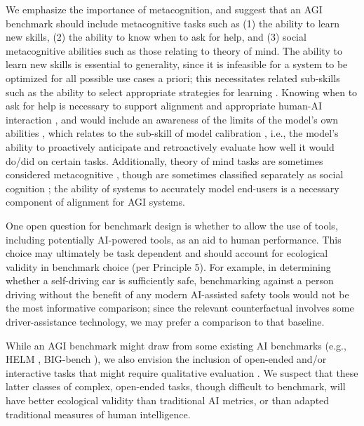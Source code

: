 \documentclass{article}
\theoremstyle{plain}
\theoremstyle{definition}
\theoremstyle{remark}
\begin{document}
We emphasize the importance of metacognition, and suggest that an AGI benchmark should include metacognitive tasks such as (1) the ability to learn new skills, (2) the ability to know when to ask for help, and (3) social metacognitive abilities such as those relating to theory of mind. The ability to learn new skills \citep{chollet2019measure} is essential to generality, since it is infeasible for a system to be optimized for all possible use cases a priori; this necessitates related sub-skills such as the ability to select appropriate strategies for learning \citep{pressleyMetacog}. Knowing when to ask for help is necessary to support alignment and appropriate human-AI interaction \citep{terryHCIAlignment}, and would include an awareness of the limits of the model’s own abilities \citep{demetriouMetacog}, which relates to the sub-skill of model calibration \citep{liang2023holistic}, i.e., the model’s ability to proactively anticipate and retroactively evaluate how well it would do/did on certain tasks. Additionally, theory of mind tasks are sometimes considered metacognitive \citep{TullisMetacog}, though are sometimes classified separately as social cognition \citep{gardnerTheory}; the ability of systems to accurately model end-users is a necessary component of alignment for AGI systems. 

One open question for benchmark design is whether to allow the use of tools, including potentially AI-powered tools, as an aid to human performance. This choice may ultimately be task dependent and should account for ecological validity in benchmark choice (per Principle 5). For example, in determining whether a self-driving car is sufficiently safe, benchmarking against a person driving without the benefit of any modern AI-assisted safety tools would not be the most informative comparison; since the relevant counterfactual involves some driver-assistance technology, we may prefer a comparison to that baseline. 

While an AGI benchmark might draw from some existing AI benchmarks \citep{haiblog} (e.g., HELM \citep{liang2023holistic}, BIG-bench \citep{srivastava2023imitation}), we also envision the inclusion of open-ended and/or interactive tasks that might require qualitative evaluation \citep{papakyriakopoulos2021qualitative, yang2023dawn, bubeck2023sparks}. We suspect that these latter classes of complex, open-ended tasks, though difficult to benchmark, will have better ecological validity than traditional AI metrics, or than adapted traditional measures of human intelligence. 
\end{document}

